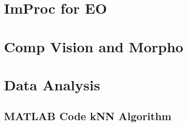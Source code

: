\appendix
\section{ ImProc for EO}

\section{Comp Vision and Morpho}

\section{Data Analysis}

\subsection{MATLAB Code kNN Algorithm}
\label{apdx:kNN}


